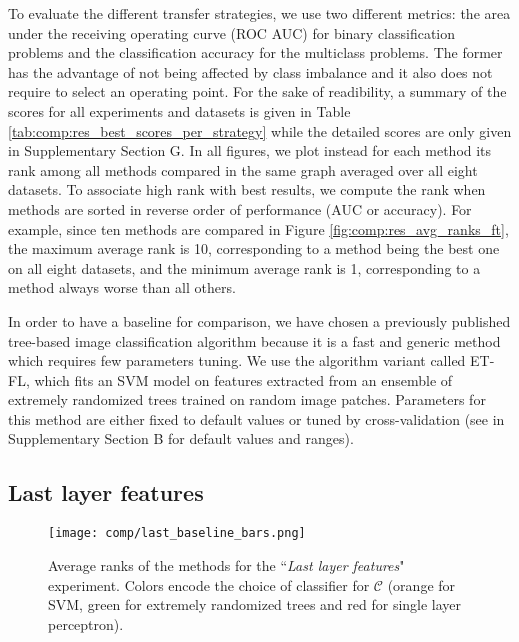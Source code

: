 To evaluate the different transfer strategies, we use two different metrics: the area under the receiving operating curve (ROC AUC) for binary classification problems and the classification accuracy for the multiclass problems. The former has the advantage of not being affected by class imbalance and it also does not require to select an operating point. For the sake of readibility, a summary of the scores for all experiments and datasets is given in Table \ref{tab:comp:res_best_scores_per_strategy} while the detailed scores are only given in Supplementary Section G. In all figures, we plot instead for each method its rank among all methods compared in the same graph averaged over all eight datasets. To associate high rank with best results, we compute the rank when methods are sorted in reverse order of performance (AUC or accuracy). For example, since ten methods are compared in Figure \ref{fig:comp:res_avg_ranks_ft}, the maximum average rank is 10, corresponding to a method being the best one on all eight datasets, and the minimum average rank is 1, corresponding to a method always worse than all others.

In order to have a baseline for comparison, we have chosen a previously published tree-based image classification algorithm \parencite{maree2016towards} because it is a fast and generic method which requires few parameters tuning. We use the algorithm variant called ET-FL, which fits an SVM model on features extracted from an ensemble of extremely randomized trees trained on random image patches. Parameters for this method are either fixed to default values or tuned by cross-validation (see in Supplementary Section B for default values and ranges).



 
  
  
\subsection{Last layer features}
\label{ssec:comp:exp_last_layer}


 \begin{figure}
     \center
     \texttt{[image: comp/last\_baseline\_bars.png]}
     \caption{Average ranks of the methods for the ``\textit{Last layer features}" experiment. Colors encode the choice of classifier for $\mathcal{C}$ (orange for SVM, green for extremely randomized trees and red for single layer perceptron).}
     \label{fig:comp:avg_ranks_last_layer}
 \end{figure}

